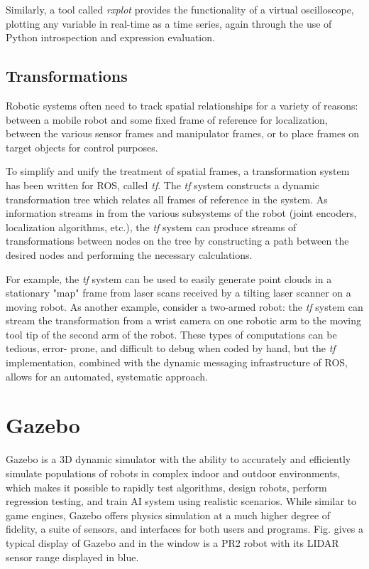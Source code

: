 Similarly, a tool called \textit{rxplot} provides the functionality of a virtual oscilloscope, plotting any variable in real-time as a time series, again through the use of Python introspection and expression evaluation.

\subsection{Transformations}

Robotic systems often need to track spatial relationships for a variety of reasons: between a mobile robot and some fixed frame of reference for localization, between the various sensor frames and manipulator frames, or to place frames on target objects for control purposes.

To simplify and unify the treatment of spatial frames, a transformation system has been written for ROS, called \textit{tf}. The \textit{tf} system constructs a dynamic transformation tree which relates all frames of reference in the system. As information streams in from the various subsystems of the robot (joint encoders, localization algorithms, etc.), the \textit{tf} system can produce streams of transformations between nodes on the tree by constructing a path between the desired nodes and performing the necessary calculations.

For example, the \textit{tf} system can be used to easily generate point clouds in a stationary "map" frame from laser scans received by a tilting laser scanner on a moving robot. As another example, consider a two-armed robot: the \textit{tf} system can stream the transformation from a wrist camera on one robotic arm to the moving tool tip of the second arm of the robot. These types of computations can be tedious, error- prone, and difficult to debug when coded by hand, but the \textit{tf} implementation, combined with the dynamic messaging infrastructure of ROS, allows for an automated, systematic approach.

\section{Gazebo}

Gazebo is a 3D dynamic simulator with the ability to accurately and efficiently simulate populations of robots in complex indoor and outdoor environments, which makes it possible to rapidly test algorithms, design robots, perform regression testing, and train AI system using realistic scenarios. While similar to game engines, Gazebo offers physics simulation at a much higher degree of fidelity, a suite of sensors, and interfaces for both users and programs. Fig. \label{fig:pr2} gives a typical display of Gazebo and in the window is a PR2 robot \cite{PR2008} with its LIDAR sensor range displayed in blue.

